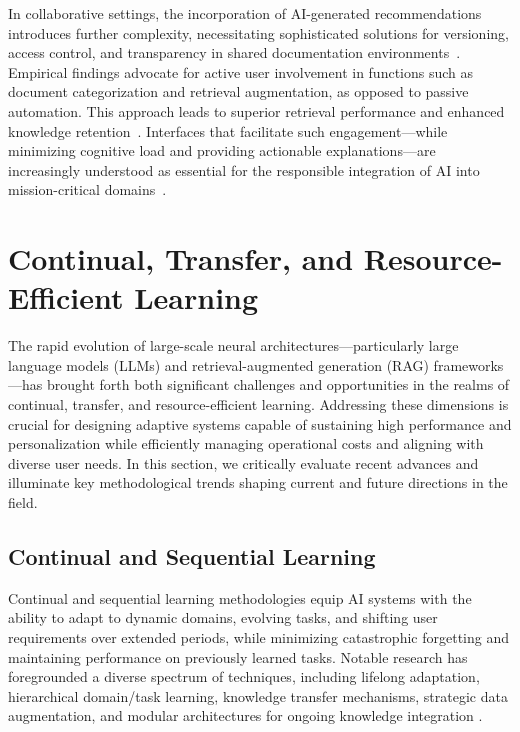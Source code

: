 \documentclass[sigconf]{acmart}
\begin{document}
In collaborative settings, the incorporation of AI-generated recommendations introduces further complexity, necessitating sophisticated solutions for versioning, access control, and transparency in shared documentation environments~\cite{ref52,ref53,ref54}. Empirical findings advocate for active user involvement in functions such as document categorization and retrieval augmentation, as opposed to passive automation. This approach leads to superior retrieval performance and enhanced knowledge retention~\cite{ref54,ref55}. Interfaces that facilitate such engagement---while minimizing cognitive load and providing actionable explanations---are increasingly understood as essential for the responsible integration of AI into mission-critical domains~\cite{ref50,ref63,ref64}.

\section{Continual, Transfer, and Resource-Efficient Learning}

The rapid evolution of large-scale neural architectures—particularly large language models (LLMs) and retrieval-augmented generation (RAG) frameworks—has brought forth both significant challenges and opportunities in the realms of continual, transfer, and resource-efficient learning. Addressing these dimensions is crucial for designing adaptive systems capable of sustaining high performance and personalization while efficiently managing operational costs and aligning with diverse user needs. In this section, we critically evaluate recent advances and illuminate key methodological trends shaping current and future directions in the field.

\subsection{Continual and Sequential Learning}

Continual and sequential learning methodologies equip AI systems with the ability to adapt to dynamic domains, evolving tasks, and shifting user requirements over extended periods, while minimizing catastrophic forgetting and maintaining performance on previously learned tasks. Notable research has foregrounded a diverse spectrum of techniques, including lifelong adaptation, hierarchical domain/task learning, knowledge transfer mechanisms, strategic data augmentation, and modular architectures for ongoing knowledge integration \cite{ref7,ref18,ref19,ref20,ref21,ref22,ref23,ref24,ref26,ref29,ref30,ref46,ref54,ref55,ref61,ref62,ref64}.
\end{document}

